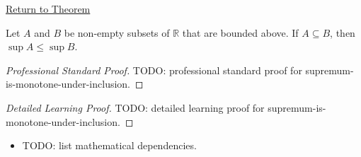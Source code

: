 \newpage
{}
\label{prf:supremum-is-monotone-under-inclusion}

\begin{remark*}[Return]
\hyperref[thm:supremum-is-monotone-under-inclusion]{Return to Theorem}
\end{remark*}

\begin{theorem*}
Let $A$ and $B$ be non-empty subsets of $\mathbb{R}$ that are bounded above. If $A \subseteq B$, then $\sup A \le \sup B$.
\end{theorem*}

\begin{proof}[Professional Standard Proof]
\LRAProofBodyStart
TODO: professional standard proof for supremum-is-monotone-under-inclusion.
\end{proof}

\begin{proof}[Detailed Learning Proof]
\LRAProofBodyStart
TODO: detailed learning proof for supremum-is-monotone-under-inclusion.
\end{proof}

\begin{remark*}
\end{remark*}

\begin{dependencies}
\begin{itemize}
  \item TODO: list mathematical dependencies.
\end{itemize}
\end{dependencies}

\clearpage
